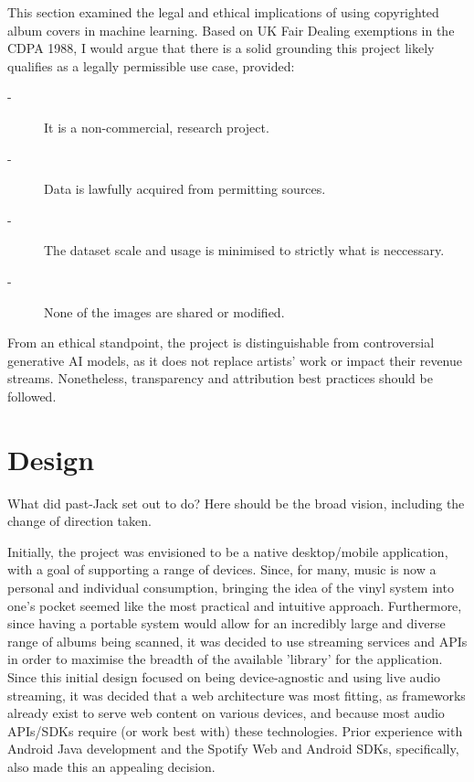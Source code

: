                  This section examined the legal and ethical implications of using copyrighted album covers in machine learning. Based on UK Fair Dealing exemptions in the CDPA 1988, I would argue that there is a solid grounding this project likely qualifies as a legally permissible use case, provided:
                  \begin{description}
                      \item[-] It is a non-commercial, research project.
                      \item[-] Data is lawfully acquired from permitting sources.
                      \item[-] The dataset scale and usage is minimised to strictly what is neccessary.
                      \item[-] None of the images are shared or modified. %
                  \end{description}
                  
                  From an ethical standpoint, the project is distinguishable from controversial generative AI models, as it does not replace artists’ work or impact their revenue streams. Nonetheless, transparency and attribution best practices should be followed.
    
    \section{Design} %
        \begin{temp}
            What did past-Jack set out to do? Here should be the broad vision, including the change of direction taken.
        \end{temp}
    
        Initially, the project was envisioned to be a native desktop/mobile application, with a goal of supporting a range of devices. Since, for many, music is now a personal and individual consumption, bringing the idea of the vinyl system into one's pocket seemed like the most practical and intuitive approach. Furthermore, since having a portable system would allow for an incredibly large and diverse range of albums being scanned, it was decided to use streaming services and APIs in order to maximise the breadth of the available 'library' for the application. Since this initial design focused on being device-agnostic and using live audio streaming, it was decided that a web architecture was most fitting, as frameworks already exist to serve web content on various devices, and because most audio APIs/SDKs require (or work best with) these technologies. Prior experience with Android Java development and the Spotify Web and Android SDKs, specifically, also made this an appealing decision.
    
